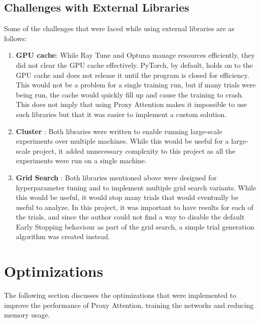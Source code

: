 \subsection{Challenges with External Libraries} \label{sec:challenges_with_external_libraries}
Some of the challenges that were faced while using external libraries are as follows:
\begin{enumerate}
    \item \textbf{GPU cache}: While Ray Tune and Optuna manage resources efficiently, they did not clear the GPU cache effectively. PyTorch, by default, holds on to the GPU cache and does not release it until the program is closed for efficiency. This would not be a problem for a single training run, but if many trials were being run, the cache would quickly fill up and cause the training to crash. This does not imply that using Proxy Attention makes it impossible to use such libraries but that it was easier to implement a custom solution.
    \item \textbf{Cluster} : Both libraries were written to enable running large-scale experiments over multiple machines. While this would be useful for a large-scale project, it added unnecessary complexity to this project as all the experiments were run on a single machine.
    \item \textbf{Grid Search} : Both libraries mentioned above were designed for hyperparameter tuning and to implement multiple grid search variants. While this would be useful, it would stop many trials that would eventually be useful to analyze. In this project, it was important to have results for each of the trials, and since the author could not find a way to disable the default Early Stopping behaviour as part of the grid search, a simple trial generation algorithm was created instead.
\end{enumerate}

\section{Optimizations}
The following section discusses the optimizations that were implemented to improve the performance of Proxy Attention, training the networks and reducing memory usage.

